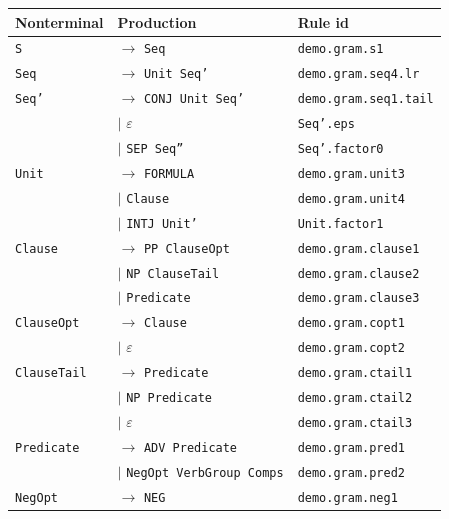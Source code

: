 \begin{longtable}{@{}l l l@{}}
\toprule
\textbf{Nonterminal} & \textbf{Production} & \textbf{Rule id} \\
\midrule
\endhead
\bottomrule
\endfoot
\texttt{S} & $\rightarrow$ \texttt{Seq} & \scriptsize\texttt{demo.gram.s1} \\
\addlinespace
\texttt{Seq} & $\rightarrow$ \texttt{Unit Seq'} & \scriptsize\texttt{demo.gram.seq4.lr} \\
\addlinespace
\texttt{Seq'} & $\rightarrow$ \texttt{CONJ Unit Seq'} & \scriptsize\texttt{demo.gram.seq1.tail} \\
\texttt{} & $\mid$ $\varepsilon$ & \scriptsize\texttt{Seq'.eps} \\
\texttt{} & $\mid$ \texttt{SEP Seq''} & \scriptsize\texttt{Seq'.factor0} \\
\addlinespace
\texttt{Unit} & $\rightarrow$ \texttt{FORMULA} & \scriptsize\texttt{demo.gram.unit3} \\
\texttt{} & $\mid$ \texttt{Clause} & \scriptsize\texttt{demo.gram.unit4} \\
\texttt{} & $\mid$ \texttt{INTJ Unit'} & \scriptsize\texttt{Unit.factor1} \\
\addlinespace
\texttt{Clause} & $\rightarrow$ \texttt{PP ClauseOpt} & \scriptsize\texttt{demo.gram.clause1} \\
\texttt{} & $\mid$ \texttt{NP ClauseTail} & \scriptsize\texttt{demo.gram.clause2} \\
\texttt{} & $\mid$ \texttt{Predicate} & \scriptsize\texttt{demo.gram.clause3} \\
\addlinespace
\texttt{ClauseOpt} & $\rightarrow$ \texttt{Clause} & \scriptsize\texttt{demo.gram.copt1} \\
\texttt{} & $\mid$ $\varepsilon$ & \scriptsize\texttt{demo.gram.copt2} \\
\addlinespace
\texttt{ClauseTail} & $\rightarrow$ \texttt{Predicate} & \scriptsize\texttt{demo.gram.ctail1} \\
\texttt{} & $\mid$ \texttt{NP Predicate} & \scriptsize\texttt{demo.gram.ctail2} \\
\texttt{} & $\mid$ $\varepsilon$ & \scriptsize\texttt{demo.gram.ctail3} \\
\addlinespace
\texttt{Predicate} & $\rightarrow$ \texttt{ADV Predicate} & \scriptsize\texttt{demo.gram.pred1} \\
\texttt{} & $\mid$ \texttt{NegOpt VerbGroup Comps} & \scriptsize\texttt{demo.gram.pred2} \\
\addlinespace
\texttt{NegOpt} & $\rightarrow$ \texttt{NEG} & \scriptsize\texttt{demo.gram.neg1} \\

\end{longtable}
